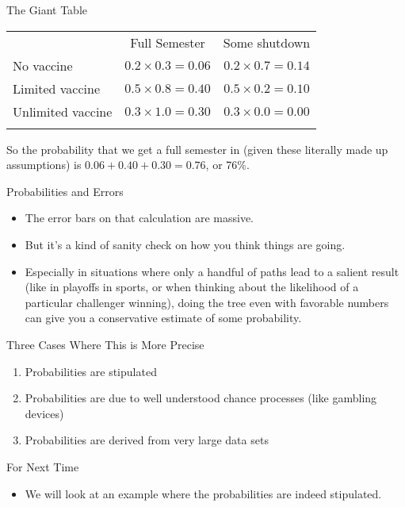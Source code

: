 \documentclass[
  ignorenonframetext,
]{beamer}
\providecommand{\tightlist}{%
  \setlength{\itemsep}{0pt}\setlength{\parskip}{0pt}}
\renewcommand{\,}{\text{, }}
\begin{document}
\begin{frame}{The Giant Table}
\protect\hypertarget{the-giant-table}{}
\begin{longtable}[]{@{}lcc@{}}
\toprule
& Full Semester & Some shutdown \\ \addlinespace
\midrule
\endhead
No vaccine & \(0.2 \times 0.3 = 0.06\) &
\(0.2 \times 0.7 = 0.14\) \\ \addlinespace
Limited vaccine & \(0.5 \times 0.8 = 0.40\) &
\(0.5 \times 0.2 = 0.10\) \\ \addlinespace
Unlimited vaccine & \(0.3 \times 1.0 = 0.30\) &
\(0.3 \times 0.0 = 0.00\) \\ \addlinespace
\bottomrule
\end{longtable}

So the probability that we get a full semester in (given these literally
made up assumptions) is \(0.06 + 0.40 + 0.30 = 0.76\), or 76\%.
\end{frame}

\begin{frame}{Probabilities and Errors}
\protect\hypertarget{probabilities-and-errors}{}
\begin{itemize}
\tightlist
\item
  The error bars on that calculation are massive.
\item
  But it's a kind of sanity check on how you think things are going.
\item
  Especially in situations where only a handful of paths lead to a
  salient result (like in playoffs in sports, or when thinking about the
  likelihood of a particular challenger winning), doing the tree even
  with favorable numbers can give you a conservative estimate of some
  probability.
\end{itemize}
\end{frame}

\begin{frame}{Three Cases Where This is More Precise}
\protect\hypertarget{three-cases-where-this-is-more-precise}{}
\begin{enumerate}
\tightlist
\item
  Probabilities are stipulated
\item
  Probabilities are due to well understood chance processes (like
  gambling devices)
\item
  Probabilities are derived from very large data sets
\end{enumerate}
\end{frame}

\begin{frame}{For Next Time}
\protect\hypertarget{for-next-time}{}
\begin{itemize}
\tightlist
\item
  We will look at an example where the probabilities are indeed
  stipulated.
\end{itemize}
\end{frame}
\end{document}
